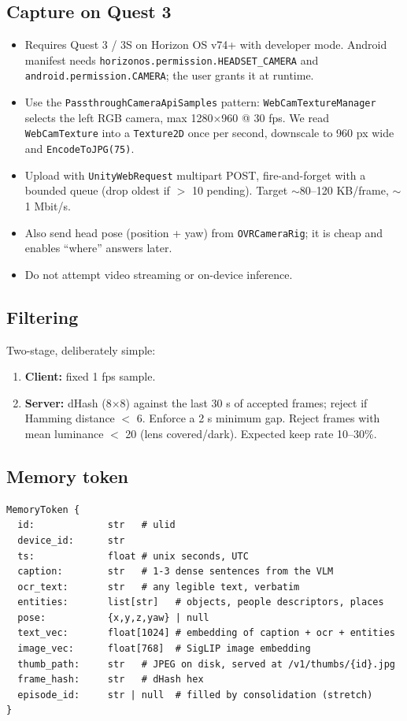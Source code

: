\documentclass[11pt,a4paper]{article}
\begin{document}
\subsection{Capture on Quest 3}
\begin{itemize}
  \item Requires Quest 3 / 3S on Horizon OS v74+ with developer mode. Android manifest needs \texttt{horizonos.permission.HEADSET\_CAMERA} and \texttt{android.permission.CAMERA}; the user grants it at runtime.
  \item Use the \texttt{PassthroughCameraApiSamples} pattern: \texttt{WebCamTextureManager} selects the left RGB camera, max 1280$\times$960 @ 30 fps. We read \texttt{WebCamTexture} into a \texttt{Texture2D} once per second, downscale to 960 px wide and \texttt{EncodeToJPG(75)}.
  \item Upload with \texttt{UnityWebRequest} multipart POST, fire-and-forget with a bounded queue (drop oldest if $>$ 10 pending). Target $\sim$80--120 KB/frame, $\sim$1 Mbit/s.
  \item Also send head pose (position + yaw) from \texttt{OVRCameraRig}; it is cheap and enables ``where'' answers later.
  \item Do not attempt video streaming or on-device inference.
\end{itemize}

\subsection{Filtering}
Two-stage, deliberately simple:
\begin{enumerate}
  \item \textbf{Client:} fixed 1 fps sample.
  \item \textbf{Server:} dHash (8$\times$8) against the last 30 s of accepted frames; reject if Hamming distance $<$ 6. Enforce a 2 s minimum gap. Reject frames with mean luminance $<$ 20 (lens covered/dark). Expected keep rate 10--30\%.
\end{enumerate}

\subsection{Memory token}\label{sec:token}
\begin{lstlisting}
MemoryToken {
  id:             str   # ulid
  device_id:      str
  ts:             float # unix seconds, UTC
  caption:        str   # 1-3 dense sentences from the VLM
  ocr_text:       str   # any legible text, verbatim
  entities:       list[str]   # objects, people descriptors, places
  pose:           {x,y,z,yaw} | null
  text_vec:       float[1024] # embedding of caption + ocr + entities
  image_vec:      float[768]  # SigLIP image embedding
  thumb_path:     str   # JPEG on disk, served at /v1/thumbs/{id}.jpg
  frame_hash:     str   # dHash hex
  episode_id:     str | null  # filled by consolidation (stretch)
}
\end{lstlisting}
\end{document}
